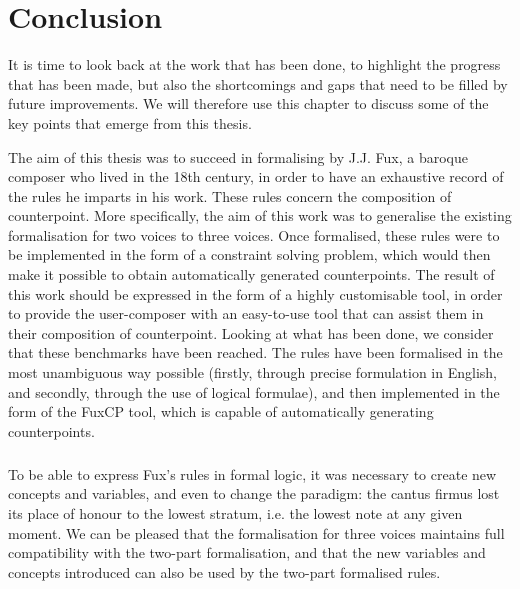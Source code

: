 \chapter*{Conclusion}\label{chapter:Conclusion}
It is time to look back at the work that has been done, to highlight the progress that has been made, but also the shortcomings and gaps that need to be filled by future improvements. We will therefore use this chapter to discuss some of the key points that emerge from this thesis.

The aim of this thesis was to succeed in formalising \gaps by J.J. Fux, a baroque composer who lived in the 18th century, in order to have an exhaustive record of the rules he imparts in his work. These rules concern the composition of counterpoint. More specifically, the aim of this work was to generalise the existing formalisation for two voices to three voices. Once formalised, these rules were to be implemented in the form of a constraint solving problem, which would then make it possible to obtain automatically generated counterpoints. The result of this work should be expressed in the form of a highly customisable tool, in order to provide the user-composer with an easy-to-use tool that can assist them in their composition of counterpoint. Looking at what has been done, we consider that these benchmarks have been reached. The rules have been formalised in the most unambiguous way possible (firstly, through precise formulation in English, and secondly, through the use of logical formulae), and then implemented in the form of the FuxCP tool, which is capable of automatically generating counterpoints. 

\paragraph{}
To be able to express Fux's rules in formal logic, it was necessary to create new concepts and variables, and even to change the paradigm: the cantus firmus lost its place of honour to the lowest stratum, i.e. the lowest note at any given moment. We can be pleased that the formalisation for three voices maintains full compatibility with the two-part formalisation, and that the new variables and concepts introduced can also be used by the two-part formalised rules.


